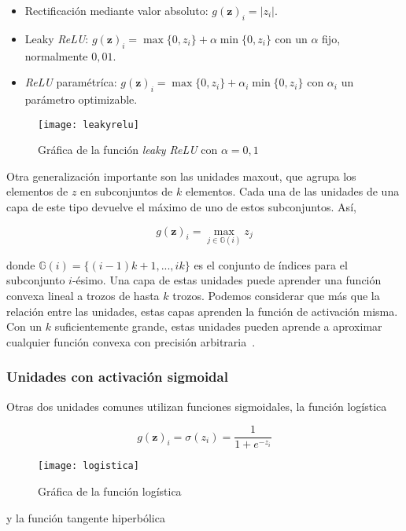 \begin{itemize}
\item Rectificación mediante valor absoluto: $g(\textbf{z})_i = \lvert z_i \rvert$.
\item Leaky \textit{ReLU}: $g(\textbf{z})_i = \max \{0,z_i\} + \alpha \min \{0,z_i\}$ con un $\alpha$ fijo, normalmente $0,01$.
\item \textit{ReLU} paramétríca: $g(\textbf{z})_i = \max\{0,z_i\} + \alpha_i \min \{0,z_i\}$ con $\alpha_i$ un parámetro optimizable.
\end{itemize}

\begin{figure}[htpb]
  \centering
  \texttt{[image: leakyrelu]}
  \caption{Gráfica de la función \textit{leaky ReLU} con $\alpha = 0,1$}
  \label{fig:leakyrelu}
\end{figure}


Otra generalización importante son las unidades maxout, que agrupa los elementos de $z$ en subconjuntos de $k$ elementos. Cada una de las unidades de una capa de este tipo devuelve el máximo de uno de estos subconjuntos. Así,

$$ g(\textbf{z})_i = \max_{j \in \mathbb{G}(i)} z_j$$

donde $\mathbb{G}(i) = \{(i-1)k +1,...,ik\}$ es el conjunto de índices para el subconjunto $i$-ésimo. Una capa de estas unidades puede aprender una función convexa lineal a trozos de hasta $k$ trozos. Podemos considerar que más que la relación entre las unidades, estas capas aprenden la función de activación misma. Con un $k$ suficientemente grande, estas unidades pueden aprende a aproximar cualquier función convexa con precisión arbitraria~\cite{goodfellow2016}.

\subsubsection{Unidades con activación sigmoidal}

Otras dos unidades comunes utilizan funciones sigmoidales, la función logística

$$g(\textbf{z})_i = \sigma(z_i) = \frac{1}{1+e^{-z_i}}$$

\begin{figure}[htpb]
  \centering
  \texttt{[image: logistica]}
  \caption{Gráfica de la función logística}
  \label{fig:logistica}
\end{figure}

y la función tangente hiperbólica


